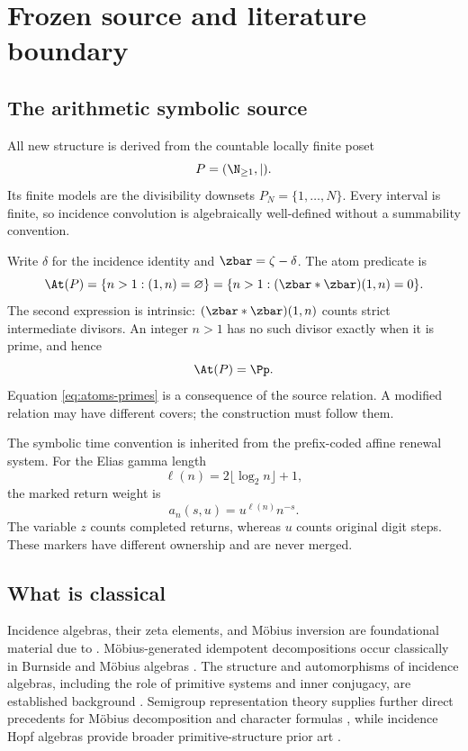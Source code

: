 \section{Frozen source and literature boundary}
\label{sec:source-literature}

\subsection{The arithmetic symbolic source}

All new structure is derived from the countable locally finite poset
\[
P=(\N_{\ge1},\mid).
\]
Its finite models are the divisibility downsets \(P_N=\{1,\ldots,N\}\).
Every interval is finite, so incidence convolution is algebraically
well-defined without a summability convention.

Write \(\delta\) for the incidence identity and
\(\zbar=\zeta-\delta\). The atom predicate is
\begin{equation}
\At(P)
=\{n>1:(1,n)=\varnothing\}
=\{n>1:(\zbar*\zbar)(1,n)=0\}.
\label{eq:atom-predicate}
\end{equation}
The second expression is intrinsic: \((\zbar*\zbar)(1,n)\) counts strict
intermediate divisors. An integer \(n>1\) has no such divisor exactly when it
is prime, and hence
\begin{equation}
\At(P)=\Pp.
\label{eq:atoms-primes}
\end{equation}
Equation \eqref{eq:atoms-primes} is a consequence of the source relation. A
modified relation may have different covers; the construction must follow
them.

The symbolic time convention is inherited from the prefix-coded affine
renewal system. For the Elias gamma length
\begin{equation}
\ell(n)=2\lfloor\log_2n\rfloor+1,
\label{eq:gamma-length}
\end{equation}
the marked return weight is
\begin{equation}
a_n(s,u)=u^{\ell(n)}n^{-s}.
\label{eq:marked-weight}
\end{equation}
The variable \(z\) counts completed returns, whereas \(u\) counts original
digit steps. These markers have different ownership and are never merged.

\subsection{What is classical}

Incidence algebras, their zeta elements, and Möbius inversion are foundational
material due to \citet{rota1964foundations}. Möbius-generated idempotent
decompositions occur classically in Burnside and Möbius algebras
\citep{solomon1967burnside,greene1973mobius}. The structure and automorphisms
of incidence algebras, including the role of primitive systems and inner
conjugacy, are established background
\citep{stanley1970incidence,baclawski1972automorphisms}. Semigroup
representation theory supplies further direct precedents for Möbius
decomposition and character formulas
\citep{steinberg2006mobius,steinberg2008mobius}, while incidence Hopf algebras
provide broader primitive-structure prior art \citep{schmitt1994incidence}.

